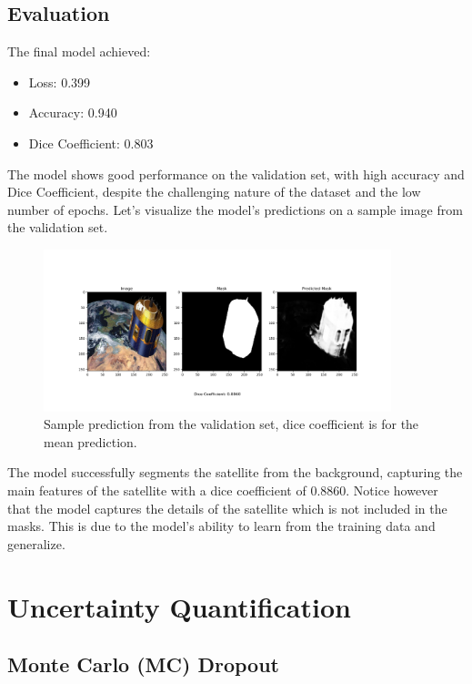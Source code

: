 \documentclass{article}
\begin{document}
\subsection{Evaluation}
The final model achieved:
\begin{itemize}
    \item Loss: 0.399
    \item Accuracy: 0.940
    \item Dice Coefficient: 0.803
\end{itemize}

The model shows good performance on the validation set, with high accuracy and Dice Coefficient, 
despite the challenging nature of the dataset and the low number of epochs. Let's visualize the model's 
predictions on a sample image from the validation set.

\begin{figure}[h]
    \centering
    \includegraphics[width=0.9\textwidth]{../images/output_sample.png}
    \caption{Sample prediction from the validation set, dice coefficient is for the mean prediction.}
    \label{fig:sample_predictions}
\end{figure}

The model successfully segments the satellite from the background, capturing the main features of the satellite
with a dice coefficient of 0.8860. Notice however that the model captures the details of the satellite which is  
not included in the masks. This is due to the model's ability to learn from the training data and generalize.

\section{Uncertainty Quantification}
\subsection{Monte Carlo (MC) Dropout}
\end{document}
